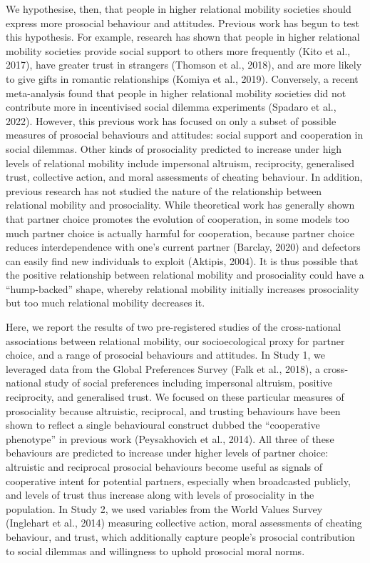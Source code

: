 \documentclass[
  man,floatsintext]{apa6}
\begin{document}
We hypothesise, then, that people in higher relational mobility societies should express more prosocial behaviour and attitudes. Previous work has begun to test this hypothesis. For example, research has shown that people in higher relational mobility societies provide social support to others more frequently (Kito et al., 2017), have greater trust in strangers (Thomson et al., 2018), and are more likely to give gifts in romantic relationships (Komiya et al., 2019). Conversely, a recent meta-analysis found that people in higher relational mobility societies did not contribute more in incentivised social dilemma experiments (Spadaro et al., 2022). However, this previous work has focused on only a subset of possible measures of prosocial behaviours and attitudes: social support and cooperation in social dilemmas. Other kinds of prosociality predicted to increase under high levels of relational mobility include impersonal altruism, reciprocity, generalised trust, collective action, and moral assessments of cheating behaviour. In addition, previous research has not studied the nature of the relationship between relational mobility and prosociality. While theoretical work has generally shown that partner choice promotes the evolution of cooperation, in some models too much partner choice is actually harmful for cooperation, because partner choice reduces interdependence with one's current partner (Barclay, 2020) and defectors can easily find new individuals to exploit (Aktipis, 2004). It is thus possible that the positive relationship between relational mobility and prosociality could have a ``hump-backed'' shape, whereby relational mobility initially increases prosociality but too much relational mobility decreases it.

Here, we report the results of two pre-registered studies of the cross-national associations between relational mobility, our socioecological proxy for partner choice, and a range of prosocial behaviours and attitudes. In Study 1, we leveraged data from the Global Preferences Survey (Falk et al., 2018), a cross-national study of social preferences including impersonal altruism, positive reciprocity, and generalised trust. We focused on these particular measures of prosociality because altruistic, reciprocal, and trusting behaviours have been shown to reflect a single behavioural construct dubbed the ``cooperative phenotype'' in previous work (Peysakhovich et al., 2014). All three of these behaviours are predicted to increase under higher levels of partner choice: altruistic and reciprocal prosocial behaviours become useful as signals of cooperative intent for potential partners, especially when broadcasted publicly, and levels of trust thus increase along with levels of prosociality in the population. In Study 2, we used variables from the World Values Survey (Inglehart et al., 2014) measuring collective action, moral assessments of cheating behaviour, and trust, which additionally capture people's prosocial contribution to social dilemmas and willingness to uphold prosocial moral norms.
\end{document}
